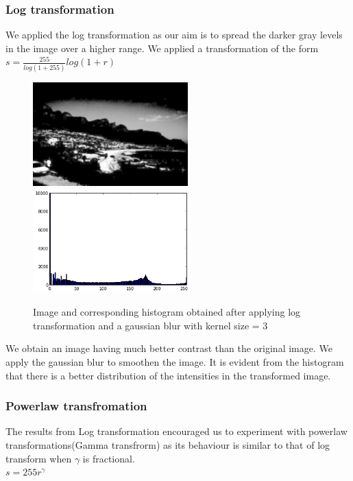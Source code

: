 \documentclass[paper=a4, fontsize=11pt]{scrartcl} %
\numberwithin{equation}{section} %
\numberwithin{figure}{section} %
\numberwithin{table}{section} %
\begin{document}
        \subsubsection{Log transformation}
        We applied the log transformation as our aim is to spread the darker gray levels in the image over a higher range. We applied a transformation of the form
        \\\(s = \frac{255}{log(1+255)} log(1+r)\)
        \begin{figure}[h!]
            \centering
            \includegraphics[clip,height=4cm]{logscene}
            \includegraphics[clip,height=4cm]{logscenehist}

            \caption{Image and corresponding histogram obtained after applying log transformation and a gaussian blur with kernel size = 3}
        \end{figure}

        We obtain an image having much better contrast than the original image. We apply the gaussian blur to smoothen the image. It is evident from the histogram that there is a better distribution of the intensities in the transformed image. 
        \subsubsection{Powerlaw transfromation}
        The results from Log transformation encouraged us to experiment with powerlaw transformations(Gamma transfrorm) as its behaviour is similar to that of log transform when \(\gamma\) is fractional.
        \\\(s = 255r^\gamma \)
\end{document}
